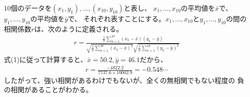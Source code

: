 \documentclass[a4paper, platex, dvipdfmx]{jsarticle}
\begin{document}
10個のデータを$(x_1,y_1),\ldots,(x_{10},y_{10})$と表し、
$x_1,\ldots,x_{10}$の平均値を$\bar{x}$で、
$y_1,\ldots,y_{10}$の平均値を$\bar{y}$で、
それぞれ表すことにする。$x_1,\ldots,x_{10}$と$y_1,\ldots,y_{10}$の間の
相関係数$r$は、次のように定義される。
\begin{align}
  r=\frac{\frac{1}{n}\sum_{k=1}^{10}(x_k-\bar{x})(y_k-\bar{y})}
  {\sqrt{\frac{1}{n}\sum_{k=1}^{10}(x_k-\bar{x})^2}\sqrt{\frac{1}{n}\sum_{k=1}^{10}(y_k-\bar{y})^2}}
\end{align}
式(1)に従って計算すると、$\bar{x}=50.2,\bar{y}=46.1$だから、
\begin{align}
  r=\frac{-4822.2}{7737.6\times 10002.9}=-0.548\cdots
\end{align}
したがって、強い相関があるわけでもないが、全くの無相関でもない程度の
負の相関があることがわかる。
\end{document}
